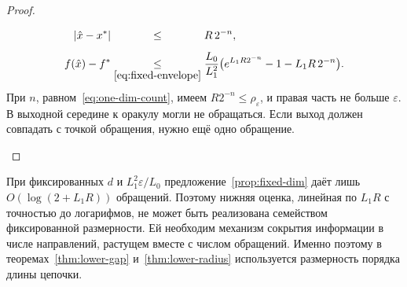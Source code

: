 \begin{proof}
\begin{itemize}
\begin{align*}
 |\hat x-x^\ast|&\bypad{\le}{}{\eqref{eq:fixed-envelope}}R\,2^{-n},\\
 f(\hat x)-f^\ast&\by{\le}{\eqref{eq:fixed-envelope}}\frac{L_0}{L_1^2}\bigl(e^{L_1R2^{-n}}-1-L_1R\,2^{-n}\bigr).
\end{align*}
При $n$, равном~\eqref{eq:one-dim-count}, имеем $R2^{-n}\le\rho_\varepsilon$, и правая часть не больше $\varepsilon$. В выходной середине к оракулу могли не обращаться. Если выход должен совпадать с точкой обращения, нужно ещё одно обращение.\qedhere
\end{itemize}
\end{proof}

\begin{remark}\label{rem:fixed-dim-growth}
При фиксированных $d$ и $L_1^2\varepsilon/L_0$ предложение~\ref{prop:fixed-dim} даёт лишь $O(\log(2+L_1R))$ обращений. Поэтому нижняя оценка, линейная по $L_1R$ с точностью до логарифмов, не может быть реализована семейством фиксированной размерности. Ей необходим механизм сокрытия информации в числе направлений, растущем вместе с числом обращений. Именно поэтому в теоремах~\ref{thm:lower-gap} и~\ref{thm:lower-radius} используется размерность порядка длины цепочки.
\end{remark}
